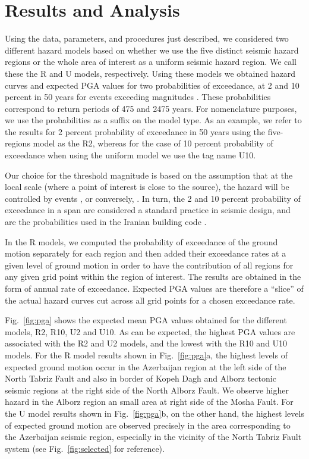 

\section{Results and Analysis}

Using the data, parameters, and procedures just described, we considered two different hazard models based on whether we use the five distinct seismic hazard regions or the whole area of interest as a uniform seismic hazard region. We call these the R and U models, respectively. Using these models we obtained hazard curves and expected PGA values for two probabilities of exceedance, at 2 and 10 percent in 50 years for events exceeding magnitudes . These probabilities correspond to return periods of 475 and 2475 years. For nomenclature purposes, we use the probabilities as a suffix on the model type. As an example, we refer to the results for 2 percent probability of exceedance in 50 years using the five-regions model as the R2, whereas for the case of 10 percent probability of exceedance when using the uniform model we use the tag name U10.

Our choice for the threshold magnitude is based on the assumption that at the local scale (where a point of interest is close to the source), the hazard will be controlled by events , or conversely, . In turn, the 2 and 10 percent probability of exceedance in a  span are considered a standard practice in seismic design, and are the probabilities used in the Iranian building code \citep{BHRC2014}.

In the R models, we computed the probability of exceedance of the ground motion separately for each region and then added their exceedance rates at a given level of ground motion in order to have the contribution of all regions for any given grid point within the region of interest. The results are obtained in the form of annual rate of exceedance. Expected PGA values are therefore a ``slice'' of the actual hazard curves cut across all grid points for a chosen exceedance rate.

Fig.~\ref{fig:pga} shows the expected mean PGA values obtained  for the different models, R2, R10, U2 and U10. As can be expected, the highest PGA values are associated with the R2 and U2 models, and the lowest with the R10 and U10 models. For the R model results shown in Fig.~\ref{fig:pga}a, the highest levels of expected ground motion occur in the Azerbaijan region at the left side of the North Tabriz Fault and also in border of Kopeh Dagh and Alborz tectonic seismic regions at the right side of the North Alborz Fault. We observe higher hazard in the Alborz region an small area at right side of the Mosha Fault. For the U model results shown in Fig.~\ref{fig:pga}b, on the other hand, the highest levels of expected ground motion are observed precisely in the area corresponding to the Azerbaijan seismic region, especially in the vicinity of the North Tabriz Fault system (see Fig.~\ref{fig:selected} for reference).


